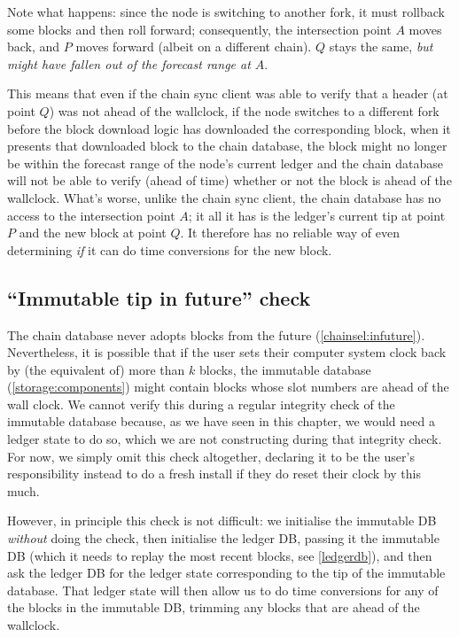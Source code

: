 Note what happens: since the node is switching to another fork, it must rollback
some blocks and then roll forward; consequently, the intersection point $A$
moves back, and $P$ moves forward (albeit on a different chain). $Q$ stays the
same, \emph{but might have fallen out of the forecast range at $A$}.

This means that even if the chain sync client was able to verify that a header
(at point $Q$) was not ahead of the wallclock, if the node switches to a
different fork before the block download logic has downloaded the corresponding
block, when it presents that downloaded block to the chain database, the block
might no longer be within the forecast range of the node's current ledger and
the chain database will not be able to verify (ahead of time) whether or not the
block is ahead of the wallclock. What's worse, unlike the chain sync client, the
chain database has no access to the intersection point $A$; it all it has is the
ledger's current tip at  point $P$ and the new block at point $Q$. It therefore
has no reliable way of even determining \emph{if} it can do time conversions for
the new block.

\subsection{``Immutable tip in future'' check}
\label{time:imm-tip-in-future}

The chain database never adopts blocks from the future
(\cref{chainsel:infuture}). Nevertheless, it is possible that if the user sets
their computer system clock back by (the equivalent of) more than $k$ blocks,
the immutable database (\cref{storage:components}) might contain blocks
whose slot numbers are ahead of the wall clock. We cannot verify this during a
regular integrity check of the immutable database because, as we have seen in
this chapter, we would need a ledger state to do so, which we are not
constructing during that integrity check. For now, we simply omit this check
altogether, declaring it to be the user's responsibility instead to do a
fresh install if they do reset their clock by this much.

However, in principle this check is not difficult: we initialise the immutable
DB \emph{without} doing the check, then initialise the ledger DB, passing it the
immutable DB (which it needs to replay the most recent blocks, see
\cref{ledgerdb}), and then ask the ledger DB for the ledger state
corresponding to the tip of the immutable database. That ledger state will then
allow us to do time conversions for any of the blocks in the immutable DB,
trimming any blocks that are ahead of the wallclock.

